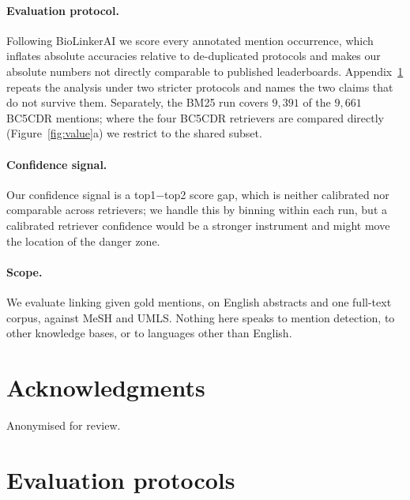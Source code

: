 \documentclass[11pt]{article}
\begin{document}
\paragraph{Evaluation protocol.} Following BioLinkerAI we score every annotated
mention occurrence, which inflates absolute accuracies relative to de-duplicated
protocols \citep{tutubalina-etal-2020-fair} and makes our absolute numbers not
directly comparable to published leaderboards. Appendix~\ref{sec:appendix-proto} repeats the analysis under two stricter
protocols and names the two claims that do not survive them.
Separately, the BM25 run covers $9{,}391$ of the $9{,}661$ BC5CDR mentions; where the
four BC5CDR retrievers are compared directly (Figure~\ref{fig:value}a) we restrict to
the shared subset.

\paragraph{Confidence signal.} Our confidence signal is a top1$-$top2 score gap, which
is neither calibrated nor comparable across retrievers; we handle this by binning
within each run, but a calibrated retriever confidence would be a stronger instrument
and might move the location of the danger zone.

\paragraph{Scope.} We evaluate linking given gold mentions, on English abstracts and
one full-text corpus, against MeSH and UMLS. Nothing here speaks to mention detection,
to other knowledge bases, or to languages other than English.

\section*{Acknowledgments}

Anonymised for review.



\appendix

\section{Evaluation protocols}
\label{sec:appendix-proto}
\end{document}
